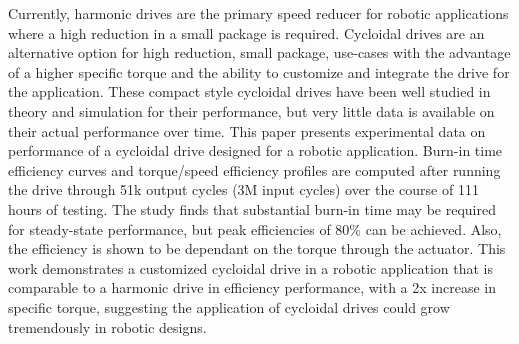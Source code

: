 Currently, harmonic drives are the primary speed reducer for robotic applications where a high reduction in a small package is required. 
Cycloidal drives are an alternative option for high reduction, small package, use-cases with the advantage of a higher specific torque and the ability to customize and integrate the drive for the application.
These compact style cycloidal drives have been well studied in theory and simulation for their performance, but very little data is available on their actual performance over time. 
This paper presents experimental data on performance of a cycloidal drive designed for a robotic application. 
Burn-in time efficiency curves and torque/speed efficiency profiles are computed after running the drive through 51k output cycles (3M input cycles) over the course of 111 hours of testing. 
The study finds that substantial burn-in time may be required for steady-state performance, but peak efficiencies of 80\% can be achieved. 
Also, the efficiency is shown to be dependant on the torque through the actuator.
This work demonstrates a customized cycloidal drive in a robotic application that is comparable to a harmonic drive in efficiency performance, with a 2x increase in specific torque, suggesting the application of cycloidal drives could grow tremendously in robotic designs. 